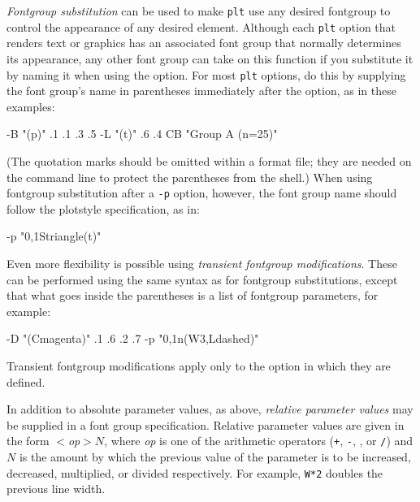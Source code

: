 \documentclass{book}
\begin{document}
%
{\em Fontgroup substitution} can be used to make {\tt plt} use any
desired fontgroup to control the appearance of any desired element.
Although each {\tt plt} option that renders text or graphics has an
associated font group that normally determines its appearance, any
other font group can take on this function if you substitute it
by naming it when using the option.  For most {\tt plt} options, do
this by supplying the font group's name in parentheses immediately
after the option, as in these examples:
\begin{center}
\begin{boxedverbatim}
-B "(p)" .1 .1 .3 .5
-L "(t)" .6 .4 CB "Group A (n=25)"
\end{boxedverbatim}
\end{center}
(The quotation marks should be omitted within a format file;  they are
needed on the command line to protect the parentheses from the shell.)
When using fontgroup substitution after a {\tt -p} option,
however, the font group name should follow the plotstyle specification,
as in:
\begin{center}
\begin{boxedverbatim}
-p "0,1Striangle(t)"
\end{boxedverbatim}
\end{center}

Even more flexibility is possible using {\em transient fontgroup
modifications}.  These can be performed using the same syntax as for
fontgroup substitutions, except that what goes inside the parentheses
is a list of fontgroup parameters, for example:
\begin{center}
\begin{boxedverbatim}
-D "(Cmagenta)" .1 .6 .2 .7
-p "0,1n(W3,Ldashed)"
\end{boxedverbatim}
\end{center}
Transient fontgroup modifications apply only to the option in which they
are defined.

In addition to absolute parameter values, as above, {\em relative
parameter values} may be supplied in a font group specification.
Relative parameter values are given in the form {\em $<$op$>N$}, where
{\em op} is one of the arithmetic operators ({\tt +}, {\tt -}, {\tt *}, or
{\tt /}) and $N$ is the amount by which the previous value of the parameter
is to be increased, decreased, multiplied, or divided respectively.  For
example, {\tt W*2} doubles the previous line width.
\end{document}
